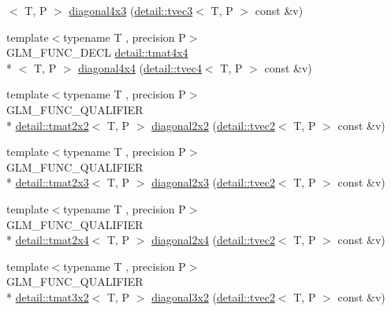 \begin{DoxyCompactItemize}
$<$ T, P $>$ \hyperlink{group__gtx__matrix__operation_gaff804ead2f02ac48c8daf0d44a81d224}{diagonal4x3} (\hyperlink{structglm_1_1detail_1_1tvec3}{detail\-::tvec3}$<$ T, P $>$ const \&v)
\item 
{\footnotesize template$<$typename T , precision P$>$ }\\G\-L\-M\-\_\-\-F\-U\-N\-C\-\_\-\-D\-E\-C\-L \hyperlink{structglm_1_1detail_1_1tmat4x4}{detail\-::tmat4x4}\\*
$<$ T, P $>$ \hyperlink{group__gtx__matrix__operation_ga0c286e9aa92074f12663617cfedfa72c}{diagonal4x4} (\hyperlink{structglm_1_1detail_1_1tvec4}{detail\-::tvec4}$<$ T, P $>$ const \&v)
\item 
{\footnotesize template$<$typename T , precision P$>$ }\\G\-L\-M\-\_\-\-F\-U\-N\-C\-\_\-\-Q\-U\-A\-L\-I\-F\-I\-E\-R \\*
\hyperlink{structglm_1_1detail_1_1tmat2x2}{detail\-::tmat2x2}$<$ T, P $>$ \hyperlink{group__gtx__matrix__operation_gae4177a43a89e6b4b7352f82198f2ea84}{diagonal2x2} (\hyperlink{structglm_1_1detail_1_1tvec2}{detail\-::tvec2}$<$ T, P $>$ const \&v)
\item 
{\footnotesize template$<$typename T , precision P$>$ }\\G\-L\-M\-\_\-\-F\-U\-N\-C\-\_\-\-Q\-U\-A\-L\-I\-F\-I\-E\-R \\*
\hyperlink{structglm_1_1detail_1_1tmat2x3}{detail\-::tmat2x3}$<$ T, P $>$ \hyperlink{group__gtx__matrix__operation_ga873468c41cb29fb84a12a866549e0136}{diagonal2x3} (\hyperlink{structglm_1_1detail_1_1tvec2}{detail\-::tvec2}$<$ T, P $>$ const \&v)
\item 
{\footnotesize template$<$typename T , precision P$>$ }\\G\-L\-M\-\_\-\-F\-U\-N\-C\-\_\-\-Q\-U\-A\-L\-I\-F\-I\-E\-R \\*
\hyperlink{structglm_1_1detail_1_1tmat2x4}{detail\-::tmat2x4}$<$ T, P $>$ \hyperlink{group__gtx__matrix__operation_gaf97e094855cc3c6186b879d045f67aca}{diagonal2x4} (\hyperlink{structglm_1_1detail_1_1tvec2}{detail\-::tvec2}$<$ T, P $>$ const \&v)
\item 
{\footnotesize template$<$typename T , precision P$>$ }\\G\-L\-M\-\_\-\-F\-U\-N\-C\-\_\-\-Q\-U\-A\-L\-I\-F\-I\-E\-R \\*
\hyperlink{structglm_1_1detail_1_1tmat3x2}{detail\-::tmat3x2}$<$ T, P $>$ \hyperlink{group__gtx__matrix__operation_gabf8e8445e2884aeaa35f0ec32ba5bd01}{diagonal3x2} (\hyperlink{structglm_1_1detail_1_1tvec2}{detail\-::tvec2}$<$ T, P $>$ const \&v)

\end{DoxyCompactItemize}
